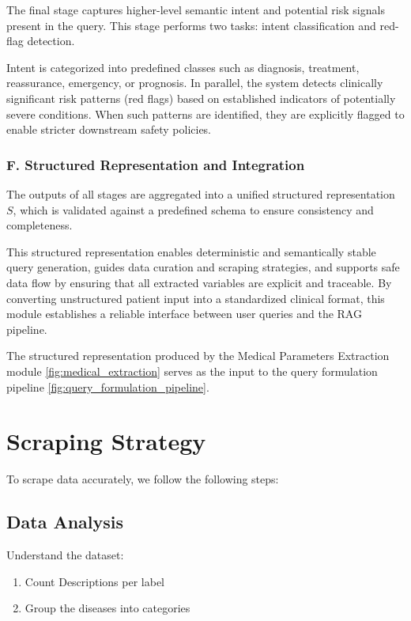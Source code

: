 \documentclass[conference, anonymous]{IEEEtran}
\begin{document}
The final stage captures higher-level semantic intent and potential risk signals present in the query. This stage performs two tasks: intent classification and red-flag detection.

Intent is categorized into predefined classes such as diagnosis, treatment, reassurance, emergency, or prognosis. In parallel, the system detects clinically significant risk patterns (red flags) based on established indicators of potentially severe conditions. When such patterns are identified, they are explicitly flagged to enable stricter downstream safety policies.

\subsubsection{F. Structured Representation and Integration}

The outputs of all stages are aggregated into a unified structured representation $S$, which is validated against a predefined schema to ensure consistency and completeness.

This structured representation enables deterministic and semantically stable query generation, guides data curation and scraping strategies, and supports safe data flow by ensuring that all extracted variables are explicit and traceable. By converting unstructured patient input into a standardized clinical format, this module establishes a reliable interface between user queries and the RAG pipeline.

The structured representation produced by the Medical Parameters Extraction module \ref{fig:medical_extraction} serves as the input to the query formulation pipeline \ref{fig:query_formulation_pipeline}.



\section{Scraping Strategy}
To scrape data accurately, we follow the following steps:

\subsection{Data Analysis}
Understand the dataset:
\begin{enumerate}
    \item Count Descriptions per label
    \item Group the diseases into categories
\end{enumerate}
\end{document}
